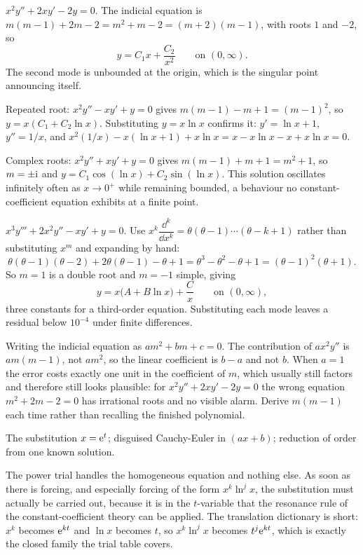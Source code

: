 \begin{worked}
$x^{2}y''+2xy'-2y=0$. The indicial equation is $m(m-1)+2m-2=m^{2}+m-2=(m+2)(m-1)$, with roots $1$ and $-2$, so
\[y=C_1x+\frac{C_2}{x^{2}}\qquad\text{on }(0,\infty).\]
The second mode is unbounded at the origin, which is the singular point announcing itself.

Repeated root: $x^{2}y''-xy'+y=0$ gives $m(m-1)-m+1=(m-1)^{2}$, so $y=x(C_1+C_2\ln x)$. Substituting $y=x\ln x$ confirms it: $y'=\ln x+1$, $y''=1/x$, and $x^{2}(1/x)-x(\ln x+1)+x\ln x=x-x\ln x-x+x\ln x=0$.

Complex roots: $x^{2}y''+xy'+y=0$ gives $m(m-1)+m+1=m^{2}+1$, so $m=\pm\mathrm{i}$ and $y=C_1\cos(\ln x)+C_2\sin(\ln x)$. This solution oscillates infinitely often as $x\to0^{+}$ while remaining bounded, a behaviour no constant-coefficient equation exhibits at a finite point.
\end{worked}

\begin{worked}
$x^{3}y'''+2x^{2}y''-xy'+y=0$. Use $x^{k}\dfrac{\dd^{k}}{\dd x^{k}}=\theta(\theta-1)\cdots(\theta-k+1)$ rather than substituting $x^{m}$ and expanding by hand:
\[\theta(\theta-1)(\theta-2)+2\theta(\theta-1)-\theta+1=\theta^{3}-\theta^{2}-\theta+1=(\theta-1)^{2}(\theta+1).\]
So $m=1$ is a double root and $m=-1$ simple, giving
\[y=x\bigl(A+B\ln x\bigr)+\frac{C}{x}\qquad\text{on }(0,\infty),\]
three constants for a third-order equation. Substituting each mode leaves a residual below $10^{-4}$ under finite differences.
\end{worked}

\begin{trap}
Writing the indicial equation as $am^{2}+bm+c=0$. The contribution of $ax^{2}y''$ is $am(m-1)$, not $am^{2}$, so the linear coefficient is $b-a$ and not $b$. When $a=1$ the error costs exactly one unit in the coefficient of $m$, which usually still factors and therefore still looks plausible: for $x^{2}y''+2xy'-2y=0$ the wrong equation $m^{2}+2m-2=0$ has irrational roots and no visible alarm. Derive $m(m-1)$ each time rather than recalling the finished polynomial.
\end{trap}

\begin{seealsob}The substitution $x=\mathrm{e}^{t}$; disguised Cauchy-Euler in $(ax+b)$; reduction of order from one known solution.\end{seealsob}

The power trial handles the homogeneous equation and nothing else. As soon as there is forcing, and especially forcing of the form $x^{k}\ln^{j}x$, the substitution must actually be carried out, because it is in the $t$-variable that the resonance rule of the constant-coefficient theory can be applied. The translation dictionary is short: $x^{k}$ becomes $\mathrm{e}^{kt}$ and $\ln x$ becomes $t$, so $x^{k}\ln^{j}x$ becomes $t^{j}\mathrm{e}^{kt}$, which is exactly the closed family the trial table covers.

